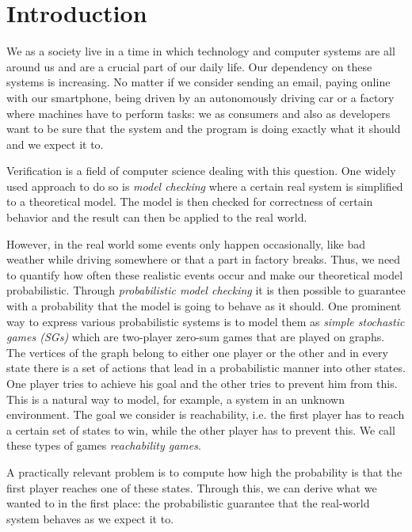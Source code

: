 \chapter{Introduction} \label{ch:intro}

We as a society live in a time in which technology and computer systems are all around us and are a crucial part of our daily life. 
Our dependency on these systems is increasing. 
No matter if we consider sending an email, paying online with our smartphone, being driven by an autonomously driving car or a factory where machines have to perform tasks: 
we as consumers and also as developers want to be sure that the system and the program is doing exactly what it should and we expect it to.

Verification is a field of computer science dealing with this question. 
One widely used approach to do so is \emph{model checking} where a certain real system is simplified to a theoretical model. 
The model is then checked for correctness of certain behavior and the result can then be applied to the real world.

However, in the real world some events only happen occasionally, like bad weather while driving somewhere or that a part in factory breaks. 
Thus, we need to quantify how often these realistic events occur and make our theoretical model probabilistic. 
Through \emph{probabilistic model checking} it is then possible to guarantee with a probability that the model is going to behave as it should. 
One prominent way to express various probabilistic systems is to model them as \emph{simple stochastic games (SGs)} which are two-player zero-sum games that are played on graphs. 
The vertices of the graph belong to either one player or the other and in every state there is a set of actions that lead in a probabilistic manner into other states. 
One player tries to achieve his goal and the other tries to prevent him from this. This is a natural way to model, for example, a system in an unknown environment.
The goal we consider is reachability, i.e. the first player has to reach a certain set of states to win, while the other player has to prevent this. 
We call these types of games \emph{reachability games}.

A practically relevant problem is to compute how high the probability is that the first player reaches one of these states. 
Through this, we can derive what we wanted to in the first place: 
the probabilistic guarantee that the real-world system behaves as we expect it to.


